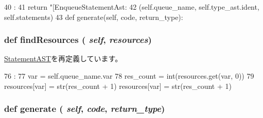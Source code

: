 \begin{DoxyCode}
40                       :
41         return "[EnqueueStatementAst: %
42                (self.queue_name, self.type_ast.ident, self.statements)
43 
    def generate(self, code, return_type):
\end{DoxyCode}
\hypertarget{classslicc_1_1ast_1_1EnqueueStatementAST_1_1EnqueueStatementAST_abd195c795639b490ba2de4c1246105f1}{
\subsubsection[{findResources}]{\setlength{\rightskip}{0pt plus 5cm}def findResources ( {\em self}, \/   {\em resources})}}
\label{classslicc_1_1ast_1_1EnqueueStatementAST_1_1EnqueueStatementAST_abd195c795639b490ba2de4c1246105f1}


\hyperlink{classslicc_1_1ast_1_1StatementAST_1_1StatementAST_abd195c795639b490ba2de4c1246105f1}{StatementAST}を再定義しています。


\begin{DoxyCode}
76                                       :
77         var = self.queue_name.var
78         res_count = int(resources.get(var, 0))
79         resources[var] = str(res_count + 1)
        resources[var] = str(res_count + 1)
\end{DoxyCode}
\hypertarget{classslicc_1_1ast_1_1EnqueueStatementAST_1_1EnqueueStatementAST_a4555d1cee0dccf3942ea35fe86de2e8e}{
\subsubsection[{generate}]{\setlength{\rightskip}{0pt plus 5cm}def generate ( {\em self}, \/   {\em code}, \/   {\em return\_\-type})}}
\label{classslicc_1_1ast_1_1EnqueueStatementAST_1_1EnqueueStatementAST_a4555d1cee0dccf3942ea35fe86de2e8e}



